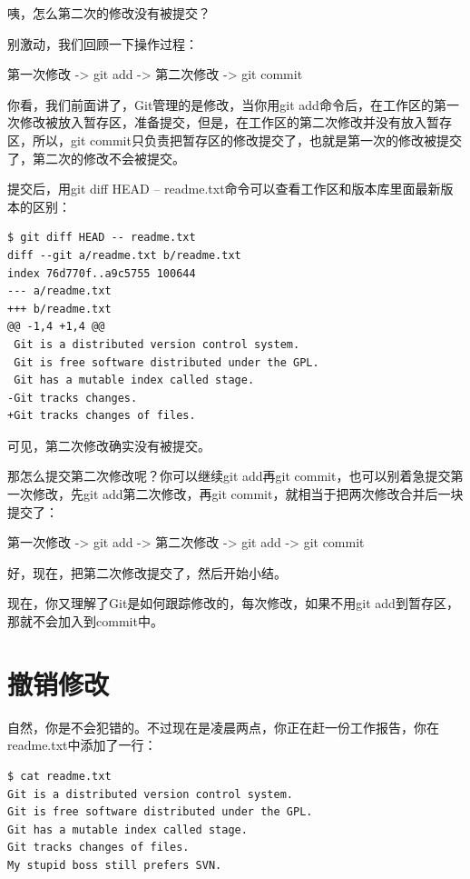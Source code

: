 咦，怎么第二次的修改没有被提交？

别激动，我们回顾一下操作过程：

第一次修改 -> git add -> 第二次修改 -> git commit

你看，我们前面讲了，Git管理的是修改，当你用git add命令后，在工作区的第一次修改被放入暂存区，准备提交，但是，在工作区的第二次修改并没有放入暂存区，所以，git commit只负责把暂存区的修改提交了，也就是第一次的修改被提交了，第二次的修改不会被提交。

提交后，用git diff HEAD -- readme.txt命令可以查看工作区和版本库里面最新版本的区别：

\begin{verbatim}
$ git diff HEAD -- readme.txt 
diff --git a/readme.txt b/readme.txt
index 76d770f..a9c5755 100644
--- a/readme.txt
+++ b/readme.txt
@@ -1,4 +1,4 @@
 Git is a distributed version control system.
 Git is free software distributed under the GPL.
 Git has a mutable index called stage.
-Git tracks changes.
+Git tracks changes of files.
\end{verbatim}

可见，第二次修改确实没有被提交。

那怎么提交第二次修改呢？你可以继续git add再git commit，也可以别着急提交第一次修改，先git add第二次修改，再git commit，就相当于把两次修改合并后一块提交了：

第一次修改 -> git add -> 第二次修改 -> git add -> git commit

好，现在，把第二次修改提交了，然后开始小结。

\begin{tcolorbox}

现在，你又理解了Git是如何跟踪修改的，每次修改，如果不用git add到暂存区，那就不会加入到commit中。
\end{tcolorbox}

\section{撤销修改}
自然，你是不会犯错的。不过现在是凌晨两点，你正在赶一份工作报告，你在readme.txt中添加了一行：

\begin{verbatim}
$ cat readme.txt
Git is a distributed version control system.
Git is free software distributed under the GPL.
Git has a mutable index called stage.
Git tracks changes of files.
My stupid boss still prefers SVN.
\end{verbatim}

